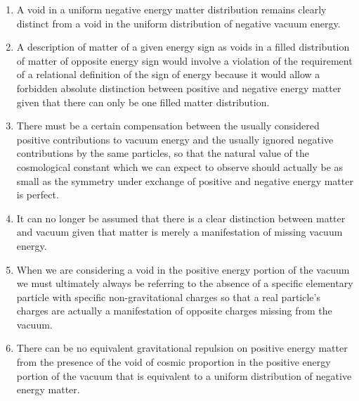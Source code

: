 \documentclass[notitlepage,12pt]{report}
\begin{document}
\begin{enumerate}
\item A void in a uniform negative energy matter distribution remains clearly distinct from a void in the uniform distribution of negative vacuum energy.

\item A description of matter of a given energy sign as voids in a filled distribution of matter of opposite energy sign would involve a violation of the requirement of a relational definition of the sign of energy because it would allow a forbidden absolute distinction between positive and negative energy matter given that there can only be one filled matter distribution.

\item There must be a certain compensation between the usually considered positive contributions to vacuum energy and the usually ignored negative contributions by the same particles, so that the natural value of the cosmological constant which we can expect to observe should actually be as small as the symmetry under exchange of positive and negative energy matter is perfect.

\item It can no longer be assumed that there is a clear distinction between matter and vacuum given that matter is merely a manifestation of missing vacuum energy.

\item When we are considering a void in the positive energy portion of the vacuum we must ultimately always be referring to the absence of a specific elementary particle with specific non-gravitational charges so that a real particle's charges are actually a manifestation of opposite charges missing from the vacuum.

\item There can be no equivalent gravitational repulsion on positive energy matter from the presence of the void of cosmic proportion in the positive energy portion of the vacuum that is equivalent to a uniform distribution of negative energy matter.


\end{enumerate}
\end{document}
